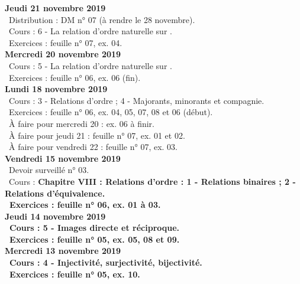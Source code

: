 \documentclass[12pt,a4paper]{article}
\begin{document}
\noindent\textbf{Jeudi 21 novembre 2019}\\
\bu\ Distribution : DM n° 07 (à rendre le 28 novembre).\\
\bu\ Cours : 6 - La relation d'ordre naturelle sur \R.\\
\bu\ Exercices : feuille n° 07, ex. 04.\vspace{.4cm}\\ 

\noindent\textbf{\bf Mercredi 20 novembre 2019}\\
\bu\ Cours : 5 - La relation d'ordre naturelle sur \N.\\
\bu\ Exercices : feuille n° 06, ex. 06 (fin).\vspace{.4cm}\\ 

\noindent\textbf{Lundi 18 novembre 2019}\\
\bu\ Cours : 3 - Relations d'ordre ;  4 - Majorants, minorants et compagnie.\\
\bu\ Exercices : feuille n° 06, ex. 04, 05, 07, 08 et 06 (début).\\ 
\bu\ À faire pour mercredi 20 : ex. 06 à finir.\\
\bu\ À faire pour jeudi 21 : feuille n° 07, ex. 01 et 02.\\
\bu\ À faire pour vendredi 22 : feuille n° 07, ex. 03.\vspace{.4cm}\\

\noindent\textbf{Vendredi 15 novembre 2019}\\
\bu\ Devoir surveillé n° 03.\\
\bu\ Cours : \bf Chapitre VIII \rm : Relations d'ordre : 1 - Relations binaires ; 2 - Relations d'équivalence.\\
\bu\ Exercices : feuille n° 06, ex. 01 à 03.\vspace{.4cm}\\

\noindent\textbf{Jeudi 14 novembre 2019}\\
\bu\ Cours : 5 - Images directe et réciproque.\\
\bu\ Exercices : feuille n° 05, ex. 05, 08 et 09.\vspace{.4cm}\\

\noindent\textbf{Mercredi 13 novembre 2019}\\
\bu\ Cours : 4 - Injectivité, surjectivité, bijectivité.\\
\bu\ Exercices : feuille n° 05, ex. 10.\vspace{.4cm}\\
\end{document}

